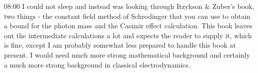 \documentclass[11pt,a4paper]{article}
\begin{document}
08:00 I could not sleep and instead was looking through Itzykson \& Zuber's book, two things - the constant  field method of Schrodinger that you can use to obtain a bound for the photon mass and the Casimir effect calculation. This book leaves out the intermediate calculations a lot and expects the reader to supply it, which is fine, except I am probably somewhat less prepared to handle this book at present. I would need much more strong mathematical background and certainly a much more strong background in classical electrodynamics. 
\end{document}

